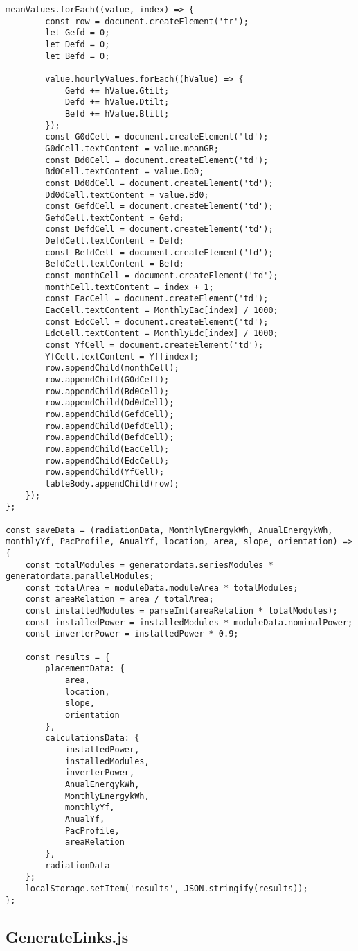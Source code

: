 \begin{lstlisting}[style=ES6, caption={public/scripts/DataAquisition.js}]
	meanValues.forEach((value, index) => {
		const row = document.createElement('tr');
		let Gefd = 0;
		let Defd = 0;
		let Befd = 0;

		value.hourlyValues.forEach((hValue) => {
			Gefd += hValue.Gtilt;
			Defd += hValue.Dtilt;
			Befd += hValue.Btilt;
		});
		const G0dCell = document.createElement('td');
		G0dCell.textContent = value.meanGR;
		const Bd0Cell = document.createElement('td');
		Bd0Cell.textContent = value.Dd0;
		const Dd0dCell = document.createElement('td');
		Dd0dCell.textContent = value.Bd0;
		const GefdCell = document.createElement('td');
		GefdCell.textContent = Gefd;
		const DefdCell = document.createElement('td');
		DefdCell.textContent = Defd;
		const BefdCell = document.createElement('td');
		BefdCell.textContent = Befd;
		const monthCell = document.createElement('td');
		monthCell.textContent = index + 1;
		const EacCell = document.createElement('td');
		EacCell.textContent = MonthlyEac[index] / 1000;
		const EdcCell = document.createElement('td');
		EdcCell.textContent = MonthlyEdc[index] / 1000;
		const YfCell = document.createElement('td');
		YfCell.textContent = Yf[index];
		row.appendChild(monthCell);
		row.appendChild(G0dCell);
		row.appendChild(Bd0Cell);
		row.appendChild(Dd0dCell);
		row.appendChild(GefdCell);
		row.appendChild(DefdCell);
		row.appendChild(BefdCell);
		row.appendChild(EacCell);
		row.appendChild(EdcCell);
		row.appendChild(YfCell);
		tableBody.appendChild(row);
	});
};

const saveData = (radiationData, MonthlyEnergykWh, AnualEnergykWh, monthlyYf, PacProfile, AnualYf, location, area, slope, orientation) => {
	const totalModules = generatordata.seriesModules * generatordata.parallelModules;
	const totalArea = moduleData.moduleArea * totalModules;
	const areaRelation = area / totalArea;
	const installedModules = parseInt(areaRelation * totalModules);
	const installedPower = installedModules * moduleData.nominalPower;
	const inverterPower = installedPower * 0.9;

	const results = {
		placementData: {
			area,
			location,
			slope,
			orientation
		},
		calculationsData: {
			installedPower,
			installedModules,
			inverterPower,
			AnualEnergykWh,
			MonthlyEnergykWh,
			monthlyYf,
			AnualYf,
			PacProfile,
			areaRelation
		},
		radiationData
	};
	localStorage.setItem('results', JSON.stringify(results));
};

\end{lstlisting}

\subsection{GenerateLinks.js}


